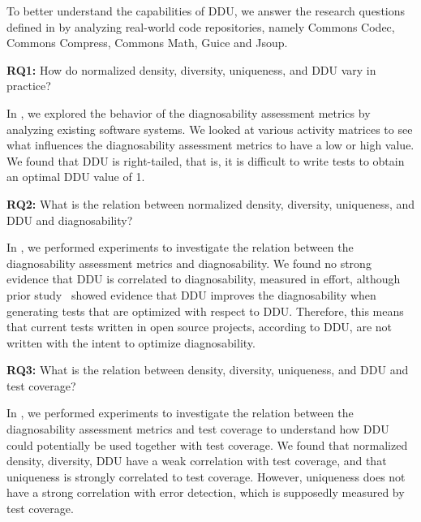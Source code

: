 \documentclass[twoside,a4paper,11pt]{memoir}
\begin{document}
To better understand the capabilities of DDU, we answer the research questions defined in  by analyzing real-world code repositories, namely Commons Codec, Commons Compress, Commons Math, Guice and Jsoup.

\begin{framed}
\noindent
\textbf{RQ1:} How do normalized density, diversity, uniqueness, and DDU vary in practice?
\end{framed}

In , we explored the behavior of the diagnosability assessment metrics by analyzing existing software systems.
We looked at various activity matrices to see what influences the diagnosability assessment metrics to have a low or high value.
We found that DDU is right-tailed, that is, it is difficult to write tests to obtain an optimal DDU value of 1.

\begin{framed}
\noindent
\textbf{RQ2:} What is the relation between normalized density, diversity, uniqueness, and DDU and diagnosability?
\end{framed}

In , we performed experiments to investigate the relation between the diagnosability assessment metrics and diagnosability.
We found no strong evidence that DDU is correlated to diagnosability, measured in effort, although prior study~\cite{DBLP:conf/icse/PerezAD17} showed evidence that DDU improves the diagnosability when generating tests that are optimized with respect to DDU\@.
Therefore, this means that current tests written in open source projects, according to DDU, are not written with the intent to optimize diagnosability.

\begin{framed}
\noindent
\textbf{RQ3:} What is the relation between density, diversity, uniqueness, and DDU and test coverage?
\end{framed}

In , we performed experiments to investigate the relation between the diagnosability assessment metrics and test coverage to understand how DDU could potentially be used together with test coverage.
We found that normalized density, diversity, DDU have a weak correlation with test coverage, and that uniqueness is strongly correlated to test coverage.
However, uniqueness does not have a strong correlation with error detection, which is supposedly measured by test coverage.
\end{document}
